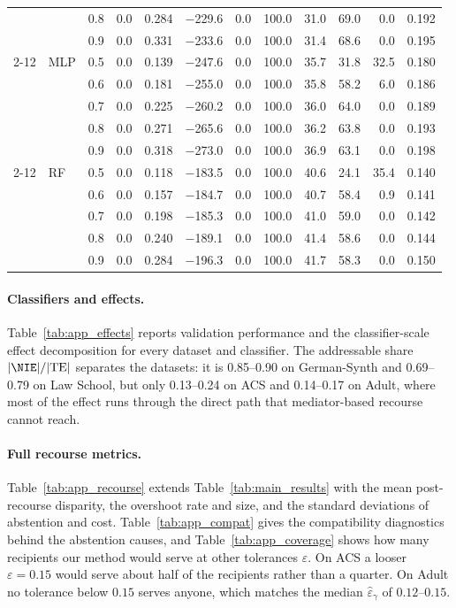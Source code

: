 \begin{table}[t]
\begin{tabular}{lllrrrrrrrrr}
 &  & 0.8 & 0.0 & 0.284 & $-$229.6 & 0.0 & 100.0 & 31.0 & 69.0 & 0.0 & 0.192 \\
 &  & 0.9 & 0.0 & 0.331 & $-$233.6 & 0.0 & 100.0 & 31.4 & 68.6 & 0.0 & 0.195 \\
\cline{2-12}
 & MLP & 0.5 & 0.0 & 0.139 & $-$247.6 & 0.0 & 100.0 & 35.7 & 31.8 & 32.5 & 0.180 \\
 &  & 0.6 & 0.0 & 0.181 & $-$255.0 & 0.0 & 100.0 & 35.8 & 58.2 & 6.0 & 0.186 \\
 &  & 0.7 & 0.0 & 0.225 & $-$260.2 & 0.0 & 100.0 & 36.0 & 64.0 & 0.0 & 0.189 \\
 &  & 0.8 & 0.0 & 0.271 & $-$265.6 & 0.0 & 100.0 & 36.2 & 63.8 & 0.0 & 0.193 \\
 &  & 0.9 & 0.0 & 0.318 & $-$273.0 & 0.0 & 100.0 & 36.9 & 63.1 & 0.0 & 0.198 \\
\cline{2-12}
 & RF & 0.5 & 0.0 & 0.118 & $-$183.5 & 0.0 & 100.0 & 40.6 & 24.1 & 35.4 & 0.140 \\
 &  & 0.6 & 0.0 & 0.157 & $-$184.7 & 0.0 & 100.0 & 40.7 & 58.4 & 0.9 & 0.141 \\
 &  & 0.7 & 0.0 & 0.198 & $-$185.3 & 0.0 & 100.0 & 41.0 & 59.0 & 0.0 & 0.142 \\
 &  & 0.8 & 0.0 & 0.240 & $-$189.1 & 0.0 & 100.0 & 41.4 & 58.6 & 0.0 & 0.144 \\
 &  & 0.9 & 0.0 & 0.284 & $-$196.3 & 0.0 & 100.0 & 41.7 & 58.3 & 0.0 & 0.150 \\
\hline
\end{tabular}
\end{table}

\paragraph{Classifiers and effects.}
Table~\ref{tab:app_effects} reports validation performance and the
classifier-scale effect decomposition for every dataset and classifier. The
addressable share $|\NIE|/|\mathrm{TE}|$ separates the datasets: it is
0.85--0.90 on German-Synth and 0.69--0.79 on Law School, but only 0.13--0.24
on ACS and 0.14--0.17 on Adult, where most of the effect runs through the
direct path that mediator-based recourse cannot reach.

\paragraph{Full recourse metrics.}
Table~\ref{tab:app_recourse} extends Table~\ref{tab:main_results} with the
mean post-recourse disparity, the overshoot rate and size, and the standard
deviations of abstention and cost. Table~\ref{tab:app_compat} gives the
compatibility diagnostics behind the abstention causes, and
Table~\ref{tab:app_coverage} shows how many recipients our method would serve
at other tolerances $\varepsilon$. On ACS a looser $\varepsilon=0.15$ would
serve about half of the recipients rather than a quarter. On Adult no
tolerance below $0.15$ serves anyone, which matches the median
$\hat\varepsilon_\gamma$ of $0.12$--$0.15$.

